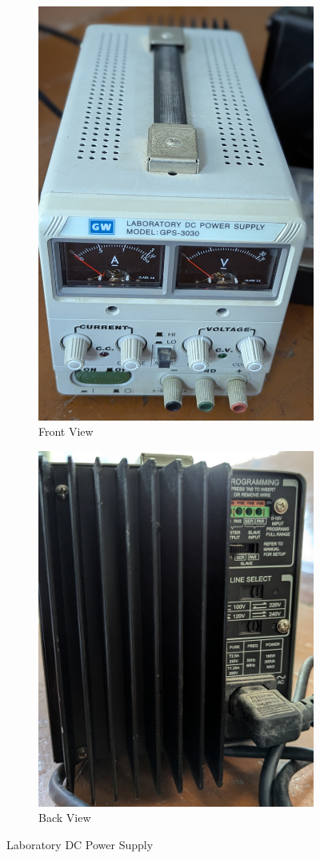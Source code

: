 \documentclass[a4paper,12pt]{article}
\begin{document}
\begin{figure}[H]
{\begin{subfigure}[t]{0.49\textwidth}
			\includegraphics[width=0.7\linewidth]{Images/27}
			\caption{Front View}
		\end{subfigure}
		\hfill
		\begin{subfigure}[t]{0.49\textwidth}
			\centering
			\includegraphics[width=0.8\linewidth]{Images/28}
			\caption{Back View}
		\end{subfigure}}
		
		\caption{Laboratory DC Power Supply}
		\label{fig:5}
	\end{figure}
	
\end{document}

